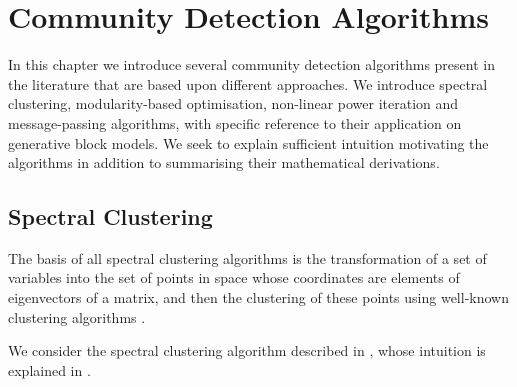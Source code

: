 
\chapter{Community Detection Algorithms}

\label{cha:communityDetectionAlgorithms}


In this chapter we introduce several community detection algorithms present in the literature that are based upon different approaches.
We introduce spectral clustering, modularity-based optimisation, non-linear power iteration and message-passing algorithms, with specific reference to their application on generative block models.
We seek to explain sufficient intuition motivating the algorithms in addition to summarising their mathematical derivations.


\section{Spectral Clustering}
\label{sec:spectralClustering}

The basis of all spectral clustering algorithms is the transformation of a set of variables into the set of points in space whose coordinates are elements of eigenvectors of a matrix, and then the clustering of these points using well-known clustering algorithms \cite{Lux06,For10}.

We consider the spectral clustering algorithm described in \cite{Lux06,For10}, whose intuition is explained in \cite{Lux06,Spi07,For10}.

